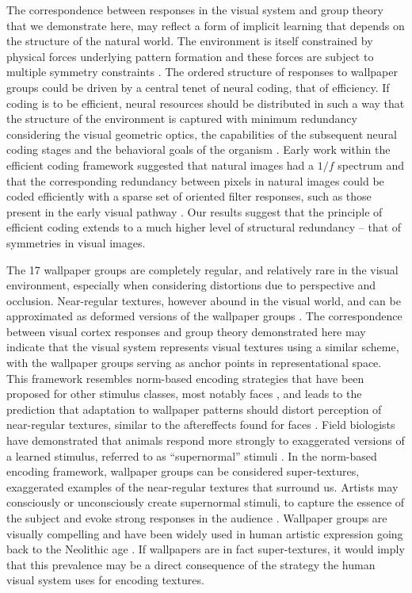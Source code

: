 \documentclass[9pt,twocolumn,twoside,lineno]{pnas-new}
\begin{document}
The correspondence between responses in the visual system and group theory that we demonstrate here, may reflect a form of implicit learning that depends on the structure of the natural world. The environment is itself constrained by physical forces underlying pattern formation and these forces are subject to multiple symmetry constraints \cite{RN1634}. The ordered structure of responses to wallpaper groups could be driven by a central tenet of neural coding, that of efficiency. If coding is to be efficient, neural resources should be distributed in such a way that the structure of the environment is captured with minimum redundancy considering the visual geometric optics, the capabilities of the subsequent neural coding stages and the behavioral goals of the organism \cite{RN1758, RN1760, RN1757, RN1756}. Early work within the efficient coding framework suggested that natural images had a $1/f$ spectrum and that the corresponding redundancy between pixels in natural images could be coded efficiently with a sparse set of oriented filter responses, such as those present in the early visual pathway \cite{RN1740, RN1446}. Our results suggest that the principle of efficient coding extends to a much higher level of structural redundancy – that of symmetries in visual images. 

The 17 wallpaper groups are completely regular, and relatively rare in the visual environment, especially when considering distortions due to perspective and occlusion. Near-regular textures, however abound in the visual world, and can be approximated as deformed versions of the wallpaper groups \cite{RN1519}. The correspondence between visual cortex responses and group theory demonstrated here may indicate that the visual system represents visual textures using a similar scheme, with the wallpaper groups serving as anchor points in representational space. This framework resembles norm-based encoding strategies that have been proposed for other stimulus classes, most notably faces \cite{RN435}, and leads to the prediction that adaptation to wallpaper patterns should distort perception of near-regular textures, similar to the aftereffects found for faces \cite{RN1768}. Field biologists have demonstrated that animals respond more strongly to exaggerated versions of a learned stimulus, referred to as “supernormal” stimuli \cite{RN1775}. In the norm-based encoding framework, wallpaper groups can be considered super-textures, exaggerated examples of the near-regular textures that surround us. Artists may consciously or unconsciously create supernormal stimuli, to capture the essence of the subject and evoke strong responses in the audience \cite{RN1764}. Wallpaper groups are visually compelling and have been widely used in human artistic expression going back to the Neolithic age \cite{RN1949}. If wallpapers are in fact super-textures, it would imply that this prevalence may be a direct consequence of the strategy the human visual system uses for encoding textures. 
\end{document}
